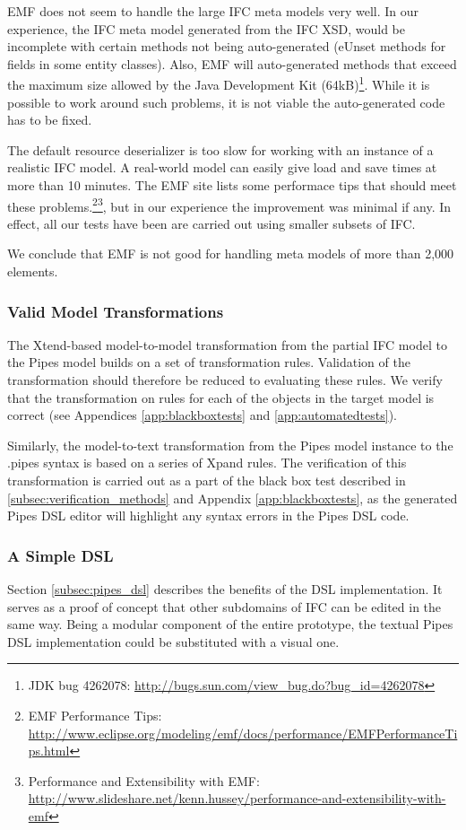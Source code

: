 EMF does not seem to handle the large IFC meta models very well. In our experience, the IFC meta model generated from the IFC XSD, would be incomplete with certain methods not being auto-generated (eUnset methods for fields in some entity classes). Also, EMF will auto-generated methods that exceed the maximum size allowed by the Java Development Kit (64kB)\footnote{JDK bug 4262078: \url{http://bugs.sun.com/view_bug.do?bug_id=4262078}}. While it is possible to work around such problems, it is not viable the auto-generated code has to be fixed.

The default resource deserializer is too slow for working with an instance of a realistic IFC model. A real-world model can easily give load and save times at more than 10 minutes. The EMF site lists some performace tips that should meet these problems.\footnote{EMF Performance Tips: \url{http://www.eclipse.org/modeling/emf/docs/performance/EMFPerformanceTips.html}}\footnote{Performance and Extensibility with EMF: \url{http://www.slideshare.net/kenn.hussey/performance-and-extensibility-with-emf}}, but in our experience the improvement was minimal if any. In effect, all our tests have been are carried out using smaller subsets of IFC.

We conclude that EMF is not good for handling meta models of more than 2,000 elements.

\subsubsection{Valid Model Transformations} The Xtend-based model-to-model transformation from the partial IFC model to the Pipes model builds on a set of transformation rules. Validation of the transformation should therefore be reduced to evaluating these rules. We verify that the transformation on rules for each of the objects in the target model is correct (see Appendices \ref{app:blackboxtests} and \ref{app:automatedtests}).

Similarly, the model-to-text transformation from the Pipes model instance to the .pipes syntax is based on a series of Xpand rules. The verification of this transformation is carried out as a part of the black box test described in \ref{subsec:verification_methods} and Appendix \ref{app:blackboxtests}, as the generated Pipes DSL editor will highlight any syntax errors in the Pipes DSL code.

\subsubsection{A Simple DSL} Section \ref{subsec:pipes_dsl} describes the benefits of the DSL implementation. It serves as a proof of concept that other subdomains of IFC can be edited in the same way. Being a modular component of the entire prototype, the textual Pipes DSL implementation could be substituted with a visual one.

